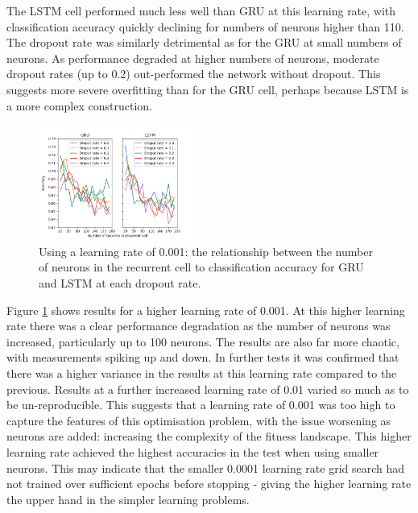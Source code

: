     The LSTM cell performed much less well than GRU at this learning rate, with
    classification accuracy quickly declining for numbers of neurons higher than
    110. The dropout rate was similarly detrimental as for the GRU at
    small numbers of neurons. As performance degraded at higher numbers of
    neurons, moderate dropout rates (up to 0.2) out-performed the network without
    dropout. This suggests more severe overfitting than for the GRU cell,
    perhaps because LSTM is a more complex construction. 

    \begin{figure}[ht]
      \includegraphics[width=0.45\textwidth]{Figures/n_neurons_plot-0-001.png}
      \caption{Using a learning rate of 0.001: the relationship between the number of neurons in the recurrent
        cell to classification accuracy for GRU and LSTM at each dropout rate.}
      \label{fig:learn_rate_0.001}
    \end{figure}

    Figure \ref{fig:learn_rate_0.001} shows results for a higher learning rate
    of 0.001. At this higher learning rate there was a clear performance
    degradation as the number of neurons was increased, particularly up to 100
    neurons. The results are also far more chaotic, with measurements spiking up
    and down. In further tests it was confirmed that there was a higher variance in
    the results at this learning rate compared to the previous. Results at a
    further increased learning rate of 0.01 varied so much as to be
    un-reproducible. This suggests that a learning rate of 0.001 was too high to
    capture the features of this optimisation problem, with the issue worsening
    as neurons are added: increasing the complexity of the fitness landscape.
    This higher learning rate achieved the highest accuracies in the test when
    using smaller neurons. This may indicate that the smaller 0.0001 learning rate grid
    search had not trained over sufficient epochs before stopping - giving the
    higher learning rate the upper hand in the simpler learning problems.

